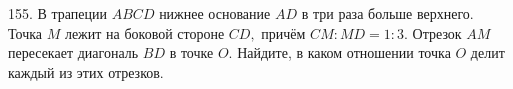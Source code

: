 155. В трапеции $ABCD$ нижнее основание $AD$ в три раза больше верхнего. Точка $M$ лежит на боковой
стороне $CD,$ причём $CM:MD=1:3.$ Отрезок $AM$ пересекает диагональ $BD$ в точке $O.$ Найдите, в
каком отношении точка $O$ делит каждый из этих отрезков.\\
